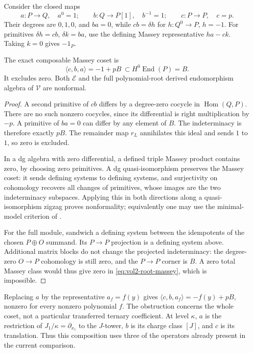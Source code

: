Consider the closed maps
\[
 a:P\to Q,\quad a^0=1;\qquad
 b:Q\to P[1],\quad b^{-1}=1;\qquad
 c:P\to P,\quad c=p.
\]
Their degrees are $0,1,0$, and $ba=0$, while
$cb=\delta h$ for $h:Q^0\to P$, $h=-1$.
For primitives $\delta h=cb$, $\delta k=ba$, use the defining
Massey representative $ha-ck$. Taking $k=0$ gives $-1_P$.

\begin{theorem}\label{thm:vol2-root-massey}
The exact composable Massey coset is
\begin{equation}\label{eq:vol2-root-massey}
 \langle c,b,a\rangle=-1+pB\ \subset H^0\operatorname{End}(P)=B.
\end{equation}
It excludes zero. Both $\mathscr E$ and the full polynomial-root
derived endomorphism algebra of $\mathcal V$ are nonformal.
\end{theorem}
\begin{proof}
A second primitive of $cb$ differs by a degree-zero cocycle in
$\operatorname{Hom}(Q,P)$. There are no such nonzero cocycles,
since its differential is right multiplication by $-p$.
A primitive of $ba=0$ can differ by any element of $B$.
The indeterminacy is therefore exactly $pB$. The remainder map
$r_L$ annihilates this ideal and sends $1$ to $1$, so zero is
excluded.

In a dg algebra with zero differential, a defined triple Massey
product contains zero, by choosing zero primitives. A dg
quasi-isomorphism preserves the Massey coset: it sends defining
systems to defining systems, and surjectivity on cohomology
recovers all changes of primitives, whose images are the two
indeterminacy subspaces. Applying this in both directions along
a quasi-isomorphism zigzag proves nonformality; equivalently one
may use the minimal-model criterion of
\cite[\S\S3.3--3.4]{KellerAInfinity2001}.

For the full module, sandwich a defining system between the
idempotents of the chosen $P\oplus O$ summand. Its $P\to P$
projection is a defining system above. Additional matrix blocks
do not change the projected indeterminacy: the degree-zero
$O\to P$ cohomology is still zero, and the $P\to P$ corner
is $B$. A zero total Massey class would thus give zero in
\eqref{eq:vol2-root-massey}, which is impossible.
\end{proof}

Replacing $a$ by the representative $a_f=f(y)$ gives
$\langle c,b,a_f\rangle=-f(y)+pB$, nonzero for every nonzero
polynomial $f$. The obstruction concerns the whole coset, not a
particular transferred ternary coefficient. At level $\kappa$,
$a$ is the restriction of $J_1/\kappa=\partial_{x_1}$ to the
$J$-tower, $b$ is its charge class $[J]$, and $c$ is its translation.
Thus this composition uses three of the operators already present
in the current comparison.

